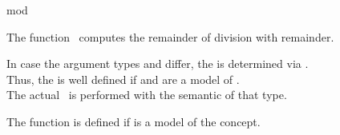 \begin{ccRefFunction}{mod}

\ccDefinition

The function \ccRefName\ computes the remainder of division with remainder.

In case the argument types  and  differ, 
the  is determined via .\\
Thus, the  is well defined if  and  
are a model of . \\
The actual \ccRefName\ is performed with the semantic of that type.

The function is defined if 
is a model of the  concept. 



\ccSeeAlso

\\
\\
\\
\\

\end{ccRefFunction}
